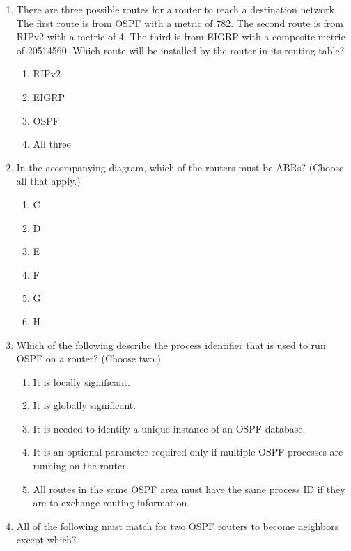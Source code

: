 \begin{enumerate}
\item
  There are three possible routes for a router to reach a destination
  network. The first route is from OSPF with a metric of 782. The second
  route is from RIPv2 with a metric of 4. The third is from EIGRP with a
  composite metric of 20514560. Which route will be installed by the
  router in its routing table?

  \begin{enumerate}
  \def\labelenumii{\Alph{enumii}.}
  \tightlist
  \item
    RIPv2
  \item
    EIGRP
  \item
    OSPF
  \item
    All three
  \end{enumerate}
\item
  In the accompanying diagram, which of the routers must be ABRs?
  (Choose all that apply.)

  \begin{figure}
  \centering
  \caption{}
  \end{figure}

  \begin{enumerate}
  \def\labelenumii{\Alph{enumii}.}
  \tightlist
  \item
    C
  \item
    D
  \item
    E
  \item
    F
  \item
    G
  \item
    H
  \end{enumerate}
\item
  \protect\hypertarget{c18.xhtmlux5cux23Page_777}{}{}Which of the
  following describe the process identifier that is used to run OSPF on
  a router? (Choose two.)

  \begin{enumerate}
  \def\labelenumii{\Alph{enumii}.}
  \tightlist
  \item
    It is locally significant.
  \item
    It is globally significant.
  \item
    It is needed to identify a unique instance of an OSPF database.
  \item
    It is an optional parameter required only if multiple OSPF processes
    are running on the router.
  \item
    All routes in the same OSPF area must have the same process ID if
    they are to exchange routing information.
  \end{enumerate}
\item
  All of the following must match for two OSPF routers to become
  neighbors except which?


\end{enumerate}

